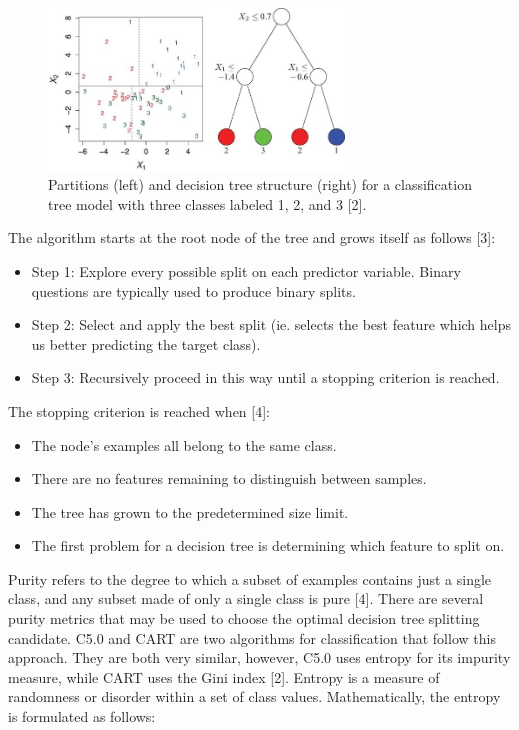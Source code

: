 \documentclass{usiinftr}
\begin{document}
\begin{figure}[h!] 
\centering
\includegraphics[width=0.7\textwidth]{images/image114.png}
\caption{Partitions (left) and decision tree structure (right) for a classification tree model with three classes labeled 1, 2, and 3 [2].}
\label{VarImp}
\end{figure}

The algorithm starts at the root node of the tree and grows itself as follows [3]: 
\begin{itemize}
\item Step 1: Explore every possible split on each predictor variable. Binary questions are typically used to produce binary splits.
\item Step 2: Select and apply the best split (ie. selects the best feature which helps us better predicting the target class).
\item Step 3: Recursively proceed in this way until a stopping criterion is reached. 
\end{itemize}

The stopping criterion is reached when [4]:
\begin{itemize}
\item The node's examples all belong to the same class.
\item There are no features remaining to distinguish between samples.
\item The tree has grown to the predetermined size limit. 
\item The first problem for a decision tree is determining which feature to split on.
\end{itemize}

Purity refers to the degree to which a subset of examples contains just a single class, and any subset made of only a single class is pure [4]. There are several purity metrics that may be used to choose the optimal decision tree splitting candidate. C5.0 and CART are two algorithms for classification that follow this approach. They are both very similar, however, C5.0 uses entropy for its impurity measure, while CART uses the Gini index [2]. Entropy is a measure of randomness or disorder within a set of class values. Mathematically, the entropy is formulated as follows: 
\end{document}
